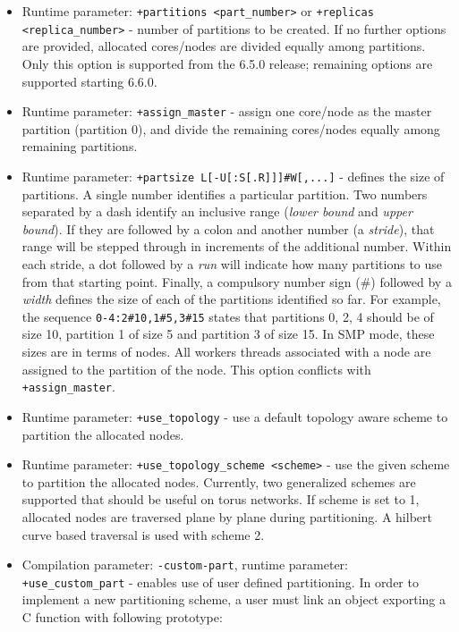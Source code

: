 \begin{itemize}
\item Runtime parameter: {\tt +partitions <part\_number>} or {\tt +replicas
<replica\_number>} - number of partitions to be created. If no further options are
provided, allocated cores/nodes are divided equally among partitions. Only this option 
is supported from the 6.5.0 release; remaining options are supported starting 6.6.0.

\item Runtime parameter: {\tt +assign\_master} - assign one core/node as the master 
partition (partition 0), and divide the remaining cores/nodes equally among remaining
partitions.

\item Runtime parameter: {\tt +partsize L[-U[:S[.R]]]\#W[,...]} - defines the size of 
partitions.  A single number identifies a particular partition. Two numbers separated by
a dash identify an inclusive range (\emph{lower bound} and \emph{upper bound}). If they 
are followed by a colon and another number (a \emph{stride}), that range will be stepped 
through in increments of the additional number. Within each stride, a dot followed by a
\emph{run} will indicate how many partitions to use from that starting point.  Finally, 
a compulsory number sign (\#) followed by a \emph{width} defines the size of each of the
partitions identified so far. For example, the sequence {\tt 0-4:2\#10,1\#5,3\#15} states that 
partitions 0, 2, 4 should be of size 10, partition 1 of size 5 and partition 3 of size 15. 
In SMP mode, these sizes are in terms of nodes. All workers threads associated with a node are
assigned to the partition of the node. This option conflicts with {\tt +assign\_master}.

\item Runtime parameter: {\tt +use\_topology} - use a default topology aware scheme
to partition the allocated nodes. 

\item Runtime parameter: {\tt +use\_topology\_scheme <scheme>} - use the given scheme
to partition the allocated nodes. Currently, two generalized schemes are supported that 
should be useful on torus networks. If scheme is set to 1, allocated nodes are traversed 
plane by plane during partitioning. A hilbert curve based traversal is used with scheme 2.

\item Compilation parameter: {\tt -custom-part}, runtime parameter: {\tt +use\_custom\_part} -
enables use of user defined partitioning. In order to implement a new partitioning scheme, 
a user must link an object exporting a C function with following prototype: \\ 


\end{itemize}
